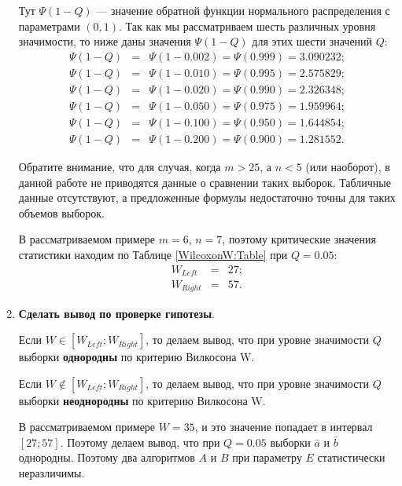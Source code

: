 \documentclass[a4paper,12pt]{article}
\begin{document}
\begin{enumerate}
Тут $ \Psi\left( 1-Q\right) $ --- значение обратной функции нормального распределения с параметрами $ \left( 0, 1\right)  $. Так как мы рассматриваем шесть различных уровня значимости, то ниже даны значения $ \Psi\left( 1-Q\right) $ для этих шести значений $Q$\cite[с. 136]{book:Bolshev1983}:
\begin{eqnarray}
\label{WilcoxonW:eq:Psi}
\Psi\left( 1-Q\right) &=& \Psi\left( 1-0.002\right) =\Psi\left( 0.999\right) = 3.090232;\\
\Psi\left( 1-Q\right) &=& \Psi\left( 1-0.010 \right) =\Psi\left( 0.995\right) =  2.575829; \nonumber\\
\Psi\left( 1-Q\right) &=& \Psi\left( 1-0.020\right) =\Psi\left( 0.990\right) = 2.326348 ; \nonumber\\
\Psi\left( 1-Q\right) &=& \Psi\left( 1-0.050\right) = \Psi\left( 0.975\right) = 1.959964;\nonumber\\ 
\Psi\left( 1-Q\right) &=& \Psi\left( 1-0.100\right) =  \Psi\left( 0.950\right) = 1.644854;\nonumber\\
\Psi\left( 1-Q\right) &=& \Psi\left( 1-0.200\right) = \Psi\left( 0.900\right) = 1.281552.\nonumber
\end{eqnarray}

Обратите внимание, что для случая, когда $m > 25$, а  $n < 5$ (или наоборот), в данной работе не приводятся данные о сравнении таких выборок. Табличные данные отсутствуют, а предложенные формулы недостаточно точны для таких объемов выборок. 

В рассматриваемом примере $m=6$, $n=7$, поэтому критические значения статистики находим по Таблице \ref{WilcoxonW:Table} при $Q=0.05$:
\begin{eqnarray*}
W_{Left}& = & 27;\\
W_{Right}& = & 57 .
\end{eqnarray*}

\item \textbf{Сделать вывод по проверке гипотезы}.

Если $W \in \left[ W_{Left}; W_{Right}\right] $, то делаем вывод, что при уровне значимости $Q$ выборки \textbf{однородны} по критерию Вилкосона W.

Если $W \notin \left[ W_{Left}; W_{Right}\right] $, то делаем вывод, что при уровне значимости $Q$ выборки \textbf{неоднородны} по критерию Вилкосона W.

В рассматриваемом примере $W=35$, и это значение попадает в интервал  $\left[ 27; 57\right] $. Поэтому делаем вывод, что при $ Q=0.05 $ выборки $ \bar{a} $ и $ \bar{b} $ однородны. Поэтому два алгоритмов $A$ и $B$ при параметру $E$ статистически неразличимы.


\end{enumerate}
\end{document}
